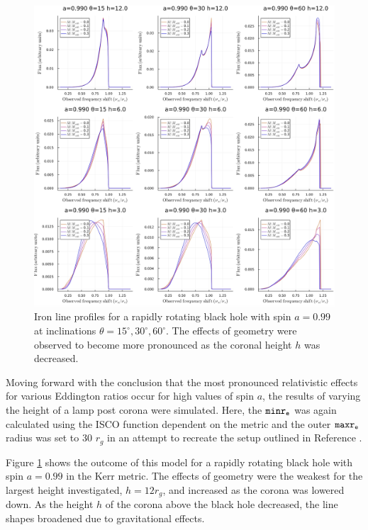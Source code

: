 \documentclass[fleqn,usenatbib,useAMS]{mnras}
\begin{document}
\begin{figure}[h!]
    \centering
    \includegraphics[width=\linewidth]{figures/taylorreynolds.png}
    \caption{Iron line profiles for a rapidly rotating black hole with spin $a = 0.99$ at inclinations $\theta = 15^{\circ}, 30^{\circ}, 60^{\circ}$. The effects of geometry were observed to become more pronounced as the coronal height $h$ was decreased.}
    \label{taylorreynolds}
\end{figure}

Moving forward with the conclusion that the most pronounced relativistic effects for various Eddington ratios occur for high values of spin $a$, the results of varying the height of a lamp post corona were simulated. Here, the ${\tt minr_{e}}$ was again calculated using the ISCO function dependent on the metric and the outer ${\tt maxr_{e}}$ radius was set to 30 $r_{g}$ in an attempt to recreate the setup outlined in Reference \cite{taylor2018exploring}.

Figure \ref{taylorreynolds} shows the outcome of this model for a rapidly rotating black hole with spin $a = 0.99$ in the Kerr metric. The effects of geometry were the weakest for the largest height investigated, $h = 12 r_{g}$, and increased as the corona was lowered down. As the height $h$ of the corona above the black hole decreased, the line shapes broadened due to gravitational effects.
\end{document}
